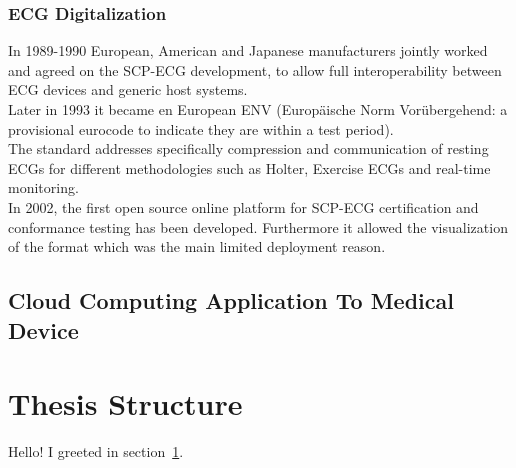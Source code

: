 \subsubsection{ECG Digitalization}
In 1989-1990 European, American and Japanese manufacturers jointly worked and agreed on the SCP-ECG development, to allow full interoperability between ECG devices and generic host systems.\\
Later in 1993 it became en European ENV (Europäische Norm Vorübergehend: a provisional eurocode to indicate they are within a test period).\\
The standard addresses specifically compression and communication of resting ECGs for different methodologies such as Holter, Exercise ECGs and real-time monitoring.\\
In 2002, the first open source online platform for SCP-ECG certification and conformance testing has been developed. Furthermore it allowed the visualization of the format which was the main limited deployment reason.\\

\cite{Chronaki} 
\subsection{Cloud Computing Application To Medical Device}


\section{Thesis Structure}
\label{sec:greetings}

Hello!
I greeted in section~\ref{sec:greetings}.